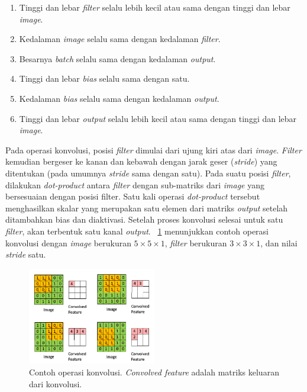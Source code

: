\begin{enumerate}
\item Tinggi dan lebar \textit{filter} selalu lebih kecil atau sama dengan tinggi dan lebar \textit{image}.
\item Kedalaman \textit{image} selalu sama dengan kedalaman \textit{filter}.
\item Besarnya \textit{batch} selalu sama dengan kedalaman \textit{output}.
\item Tinggi dan lebar \textit{bias} selalu sama dengan satu.
\item Kedalaman \textit{bias} selalu sama dengan kedalaman \textit{output}.
\item Tinggi dan lebar \textit{output} selalu lebih kecil atau sama dengan tinggi dan lebar \textit{image}.
\end{enumerate}	

Pada operasi konvolusi, posisi \textit{filter} dimulai dari ujung kiri atas dari \textit{image}. \textit{Filter} kemudian bergeser ke kanan dan kebawah dengan jarak geser (\textit{stride}) yang ditentukan (pada umumnya \textit{stride} sama dengan satu). Pada suatu posisi \textit{filter}, dilakukan \textit{dot-product} antara \textit{filter} dengan sub-matriks dari \textit{image} yang bersesuaian dengan posisi filter. Satu kali operasi \textit{dot-product} tersebut menghasilkan skalar yang merupakan satu elemen dari matriks \textit{output} setelah ditambahkan bias dan diaktivasi. Setelah proses konvolusi selesai untuk satu \textit{filter}, akan terbentuk satu kanal \textit{output}. \pic~\ref{fig:conv} menunjukkan contoh operasi konvolusi dengan \textit{image} berukuran $5 \times 5 \times 1$, \textit{filter} berukuran $3 \times 3 \times 1$, dan nilai \textit{stride} satu.

\begin{figure}
	\centering
	\includegraphics[width=0.50\textwidth]
	{pics/conv.png}
	\caption{Contoh operasi konvolusi. \textit{Convolved feature} adalah matriks keluaran dari konvolusi.}
	\label{fig:conv}
\end{figure}

